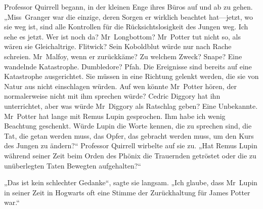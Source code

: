 Professor Quirrell begann, in der kleinen Enge ihres Büros auf und ab zu gehen. „Miss~Granger war die einzige, deren Sorgen er wirklich beachtet hat—jetzt, wo sie weg ist, sind alle Kontrollen für die Rücksichtslosigkeit des Jungen weg. Ich sehe es jetzt. Wer ist noch da? Mr~Longbottom? Mr~Potter tut nicht so, als wären sie Gleichaltrige. Flitwick? Sein Koboldblut würde nur nach Rache schreien. Mr~Malfoy, wenn er zurückkäme? Zu welchem Zweck? Snape? Eine wandelnde Katastrophe. Dumbledore? Pfah. Die Ereignisse sind bereits auf eine Katastrophe ausgerichtet. Sie müssen in eine Richtung gelenkt werden, die sie von Natur aus nicht einschlagen würden. Auf wen könnte Mr~Potter hören, der normalerweise nicht mit ihm sprechen würde? Cedric Diggory hat ihn unterrichtet, aber was würde Mr~Diggory als Ratschlag geben? Eine Unbekannte. Mr~Potter hat lange mit Remus Lupin gesprochen. Ihm habe ich wenig Beachtung geschenkt. Würde Lupin die Worte kennen, die zu sprechen sind, die Tat, die getan werden muss, das Opfer, das gebracht werden muss, um den Kurs des Jungen zu ändern?“
Professor Quirrell wirbelte auf sie zu.
„Hat Remus Lupin während seiner Zeit beim Orden des Phönix die Trauernden getröstet oder die zu unüberlegten Taten Bewegten aufgehalten?“

„Das ist kein schlechter Gedanke“, sagte sie langsam. „Ich glaube, dass Mr~Lupin in seiner Zeit in Hogwarts oft eine Stimme der Zurückhaltung für James Potter war.“

